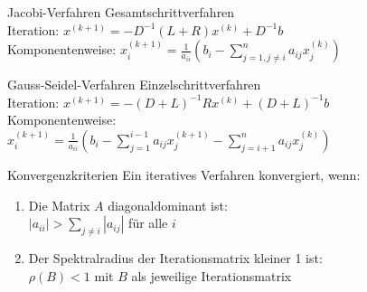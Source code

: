 \begin{concept}{Jacobi-Verfahren}
Gesamtschrittverfahren 
\vspace{1mm}\\
Iteration: $x^{(k+1)} = -D^{-1}(L + R)x^{(k)} + D^{-1}b$
\vspace{1mm}\\
Komponentenweise:
$x_i^{(k+1)} = \frac{1}{a_{ii}}(b_i - \sum_{j=1,j\neq i}^n a_{ij}x_j^{(k)})$
\end{concept}

\begin{concept}{Gauss-Seidel-Verfahren}
Einzelschrittverfahren 
\vspace{1mm}\\
Iteration: $x^{(k+1)} = -(D+L)^{-1}Rx^{(k)} + (D+L)^{-1}b$
\vspace{1mm}\\
Komponentenweise:\\
$x_i^{(k+1)} = \frac{1}{a_{ii}}(b_i - \sum_{j=1}^{i-1} a_{ij}x_j^{(k+1)} - \sum_{j=i+1}^n a_{ij}x_j^{(k)})$
\end{concept}

\begin{theorem}{Konvergenzkriterien}
Ein iteratives Verfahren konvergiert, wenn:
\begin{enumerate}
    \item Die Matrix $A$ diagonaldominant ist:\\
    $|a_{ii}| > \sum_{j\neq i} |a_{ij}|$ für alle $i$
    \item Der Spektralradius der Iterationsmatrix kleiner 1 ist:\\
    $\rho(B) < 1$ mit $B$ als jeweilige Iterationsmatrix
\end{enumerate}
\end{theorem}

